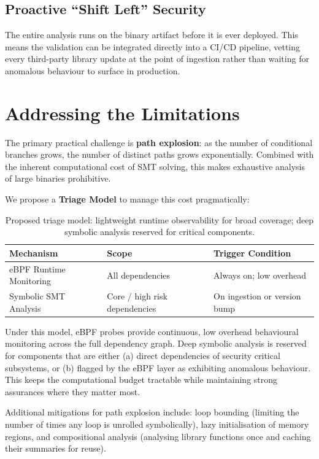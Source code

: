 \subsection{Proactive ``Shift Left'' Security}
The entire analysis runs on the binary artifact before it is ever deployed. This means the validation can be integrated directly into a CI/CD pipeline, vetting every third-party library update at the point of ingestion rather than waiting for anomalous behaviour to surface in production.
 
\section{Addressing the Limitations}
 
The primary practical challenge is \textbf{path explosion}: as the number of conditional branches grows, the number of distinct paths grows exponentially. Combined with the inherent computational cost of SMT solving, this makes exhaustive analysis of large binaries prohibitive.
 
We propose a \textbf{Triage Model} to manage this cost pragmatically:
 
\begin{table}[H]
\centering
\renewcommand{\arraystretch}{1.4}
\begin{tabular}{@{}lll@{}}
\toprule
\textbf{Mechanism} & \textbf{Scope} & \textbf{Trigger Condition} \\
\midrule
eBPF Runtime Monitoring & All dependencies & Always on; low overhead \\
Symbolic SMT Analysis & Core / high risk dependencies & On ingestion or version bump \\
\bottomrule
\end{tabular}
\caption{Proposed triage model: lightweight runtime observability for broad coverage; deep symbolic analysis reserved for critical components.}
\label{tab:triage}
\end{table}
 
Under this model, eBPF probes provide continuous, low overhead behavioural monitoring across the full dependency graph. Deep symbolic analysis is reserved for components that are either (a) direct dependencies of security critical subsystems, or (b) flagged by the eBPF layer as exhibiting anomalous behaviour. This keeps the computational budget tractable while maintaining strong assurances where they matter most.
 
Additional mitigations for path explosion include: loop bounding (limiting the number of times any loop is unrolled symbolically), lazy initialisation of memory regions, and compositional analysis (analysing library functions once and caching their summaries for reuse).

